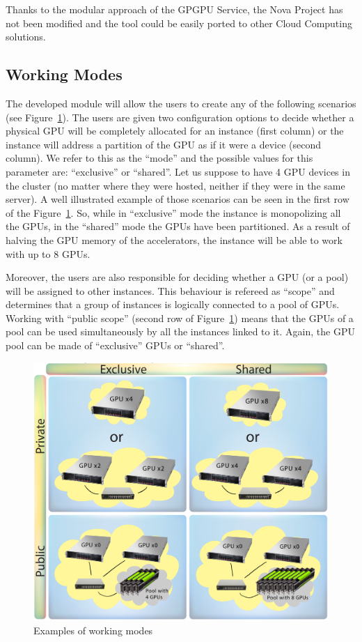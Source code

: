 \documentclass[a4paper,twoside]{article}
\begin{document}
Thanks to the modular approach of the GPGPU Service, the Nova Project has not been modified and the tool could be easily ported to other Cloud Computing solutions.

\subsection{Working Modes}
The developed module will allow the users to create any of the following scenarios (see Figure~\ref{fig2}). 
The users are given two configuration options to decide whether a physical GPU will be completely allocated for an instance (first column) or the instance will address a partition of the GPU as if it were a device (second column).
We refer to this as the ``mode'' and the possible values for this parameter are: ``exclusive'' or ``shared''. 
Let us suppose to have 4 GPU devices in the cluster (no matter where they were hosted, neither if they were in the same server). 
A well illustrated example of those scenarios can be seen in the first row of the  Figure~\ref{fig2}.
So, while in ``exclusive'' mode the instance is monopolizing all the GPUs, in the ``shared'' mode the GPUs have been partitioned. 
As a result of halving the GPU memory of the accelerators, the instance will be able to work with up to 8 GPUs.

Moreover, the users are also responsible for deciding whether a GPU (or a pool) will be assigned to other instances. 
This behaviour is refereed as ``scope'' and determines that a group of instances is logically connected to a pool of GPUs.
Working with ``public scope'' (second row of Figure~\ref{fig2}) means that the GPUs of a pool can be used simultaneously by all the instances linked to it.
Again, the GPU pool can be made of ``exclusive'' GPUs or ``shared''.

\begin{figure}[htb]
  \centering
  \includegraphics[width=.5\textwidth]{images/workingmodes.jpg}
  \caption{Examples of working modes}
  \label{fig2}
\end{figure}
\end{document}
